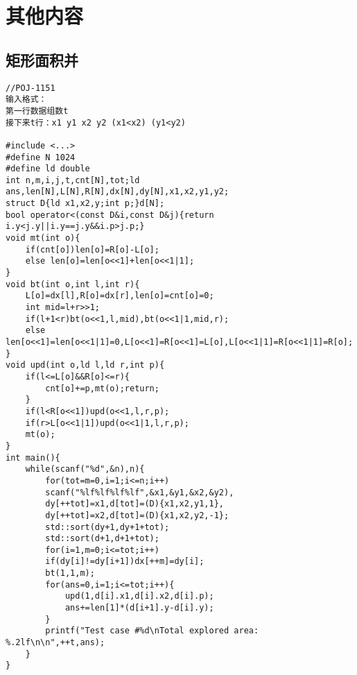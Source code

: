 \documentclass{article}
\begin{document}
\section{其他内容}

\subsection{矩形面积并}
\begin{lstlisting}
//POJ-1151
输入格式：
第一行数据组数t
接下来t行：x1 y1 x2 y2 (x1<x2) (y1<y2)

#include <...>
#define N 1024
#define ld double
int n,m,i,j,t,cnt[N],tot;ld ans,len[N],L[N],R[N],dx[N],dy[N],x1,x2,y1,y2;
struct D{ld x1,x2,y;int p;}d[N];
bool operator<(const D&i,const D&j){return i.y<j.y||i.y==j.y&&i.p>j.p;}
void mt(int o){
    if(cnt[o])len[o]=R[o]-L[o];
    else len[o]=len[o<<1]+len[o<<1|1];
}
void bt(int o,int l,int r){
    L[o]=dx[l],R[o]=dx[r],len[o]=cnt[o]=0;
    int mid=l+r>>1;
    if(l+1<r)bt(o<<1,l,mid),bt(o<<1|1,mid,r);
    else len[o<<1]=len[o<<1|1]=0,L[o<<1]=R[o<<1]=L[o],L[o<<1|1]=R[o<<1|1]=R[o];
}
void upd(int o,ld l,ld r,int p){
    if(l<=L[o]&&R[o]<=r){
        cnt[o]+=p,mt(o);return;
    }
    if(l<R[o<<1])upd(o<<1,l,r,p);
    if(r>L[o<<1|1])upd(o<<1|1,l,r,p);
    mt(o);
}
int main(){
    while(scanf("%d",&n),n){
        for(tot=m=0,i=1;i<=n;i++)
        scanf("%lf%lf%lf%lf",&x1,&y1,&x2,&y2),
        dy[++tot]=x1,d[tot]=(D){x1,x2,y1,1},
        dy[++tot]=x2,d[tot]=(D){x1,x2,y2,-1};
        std::sort(dy+1,dy+1+tot);
        std::sort(d+1,d+1+tot);
        for(i=1,m=0;i<=tot;i++)
        if(dy[i]!=dy[i+1])dx[++m]=dy[i];
        bt(1,1,m);
        for(ans=0,i=1;i<=tot;i++){
            upd(1,d[i].x1,d[i].x2,d[i].p);
            ans+=len[1]*(d[i+1].y-d[i].y);
        }
        printf("Test case #%d\nTotal explored area: %.2lf\n\n",++t,ans);
    }
}
\end{lstlisting}
\end{document}
